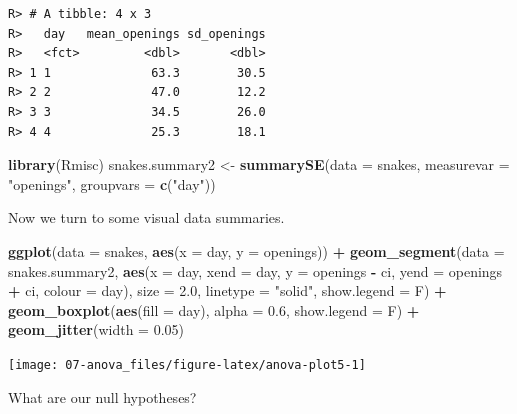 \documentclass[english,10pt,a4paper,oneside]{book}
\newenvironment{Shaded}{\begin{snugshade}}{\end{snugshade}}
\newcommand{\KeywordTok}[1]{\textcolor[rgb]{0.13,0.29,0.53}{\textbf{#1}}}
\newcommand{\DataTypeTok}[1]{\textcolor[rgb]{0.13,0.29,0.53}{#1}}
\newcommand{\FloatTok}[1]{\textcolor[rgb]{0.00,0.00,0.81}{#1}}
\newcommand{\StringTok}[1]{\textcolor[rgb]{0.31,0.60,0.02}{#1}}
\newcommand{\OperatorTok}[1]{\textcolor[rgb]{0.81,0.36,0.00}{\textbf{#1}}}
\newcommand{\NormalTok}[1]{#1}
\theoremstyle{definition}
\theoremstyle{definition}
\theoremstyle{definition}
\theoremstyle{remark}
\begin{document}
\begin{verbatim}
R> # A tibble: 4 x 3
R>   day   mean_openings sd_openings
R>   <fct>         <dbl>       <dbl>
R> 1 1              63.3        30.5
R> 2 2              47.0        12.2
R> 3 3              34.5        26.0
R> 4 4              25.3        18.1
\end{verbatim}

\begin{Shaded}
\begin{Highlighting}[]
\KeywordTok{library}\NormalTok{(Rmisc)}
\NormalTok{snakes.summary2 <-}\StringTok{ }\KeywordTok{summarySE}\NormalTok{(}\DataTypeTok{data =}\NormalTok{ snakes, }\DataTypeTok{measurevar =} \StringTok{"openings"}\NormalTok{, }\DataTypeTok{groupvars =} \KeywordTok{c}\NormalTok{(}\StringTok{"day"}\NormalTok{))}
\end{Highlighting}
\end{Shaded}

Now we turn to some visual data summaries.

\begin{Shaded}
\begin{Highlighting}[]
\KeywordTok{ggplot}\NormalTok{(}\DataTypeTok{data =}\NormalTok{ snakes, }\KeywordTok{aes}\NormalTok{(}\DataTypeTok{x =}\NormalTok{ day, }\DataTypeTok{y =}\NormalTok{ openings)) }\OperatorTok{+}
\StringTok{  }\KeywordTok{geom_segment}\NormalTok{(}\DataTypeTok{data =}\NormalTok{ snakes.summary2, }\KeywordTok{aes}\NormalTok{(}\DataTypeTok{x =}\NormalTok{ day, }\DataTypeTok{xend =}\NormalTok{ day, }\DataTypeTok{y =}\NormalTok{ openings }\OperatorTok{-}\StringTok{ }\NormalTok{ci, }\DataTypeTok{yend =}\NormalTok{ openings }\OperatorTok{+}\StringTok{ }\NormalTok{ci, }\DataTypeTok{colour =}\NormalTok{ day),}
              \DataTypeTok{size =} \FloatTok{2.0}\NormalTok{, }\DataTypeTok{linetype =} \StringTok{"solid"}\NormalTok{, }\DataTypeTok{show.legend =}\NormalTok{ F) }\OperatorTok{+}
\StringTok{  }\KeywordTok{geom_boxplot}\NormalTok{(}\KeywordTok{aes}\NormalTok{(}\DataTypeTok{fill =}\NormalTok{ day), }\DataTypeTok{alpha =} \FloatTok{0.6}\NormalTok{, }\DataTypeTok{show.legend =}\NormalTok{ F) }\OperatorTok{+}\StringTok{ }
\StringTok{  }\KeywordTok{geom_jitter}\NormalTok{(}\DataTypeTok{width =} \FloatTok{0.05}\NormalTok{)}
\end{Highlighting}
\end{Shaded}

\texttt{[image: 07-anova\_files/figure-latex/anova-plot5-1]}

What are our null hypotheses?
\end{document}
